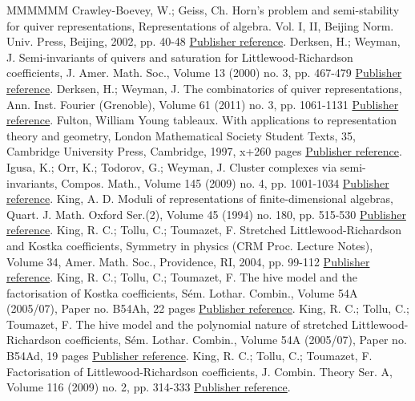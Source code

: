 \begin{thebibliography}{MMMMMM}
 Crawley-Boevey, W.; Geiss, Ch. Horn’s problem and semi-stability for quiver representations, Representations of algebra. Vol. I, II, Beijing Norm. Univ. Press, Beijing, 2002, pp. 40-48 \href{https://alco.centre-mersenne.org/articles/10.5802/alco.398/#CB}{Publisher reference}.
 Derksen, H.; Weyman, J. Semi-invariants of quivers and saturation for Littlewood-Richardson coefficients, J. Amer. Math. Soc., Volume 13 (2000) no. 3, pp. 467-479 \href{https://alco.centre-mersenne.org/articles/10.5802/alco.398/#DW1}{Publisher reference}.
 Derksen, H.; Weyman, J. The combinatorics of quiver representations, Ann. Inst. Fourier (Grenoble), Volume 61 (2011) no. 3, pp. 1061-1131 \href{https://alco.centre-mersenne.org/articles/10.5802/alco.398/#DW2}{Publisher reference}.
 Fulton, William Young tableaux. With applications to representation theory and geometry, London Mathematical Society Student Texts, 35, Cambridge University Press, Cambridge, 1997, x+260 pages \href{https://alco.centre-mersenne.org/articles/10.5802/alco.398/#F3}{Publisher reference}.
 Igusa, K.; Orr, K.; Todorov, G.; Weyman, J. Cluster complexes via semi-invariants, Compos. Math., Volume 145 (2009) no. 4, pp. 1001-1034 \href{https://alco.centre-mersenne.org/articles/10.5802/alco.398/#IOTW}{Publisher reference}.
 King, A. D. Moduli of representations of finite-dimensional algebras, Quart. J. Math. Oxford Ser.(2), Volume 45 (1994) no. 180, pp. 515-530 \href{https://alco.centre-mersenne.org/articles/10.5802/alco.398/#K}{Publisher reference}.
 King, R. C.; Tollu, C.; Toumazet, F. Stretched Littlewood-Richardson and Kostka coefficients, Symmetry in physics (CRM Proc. Lecture Notes), Volume 34, Amer. Math. Soc., Providence, RI, 2004, pp. 99-112 \href{https://alco.centre-mersenne.org/articles/10.5802/alco.398/#KTT}{Publisher reference}.
 King, R. C.; Tollu, C.; Toumazet, F. The hive model and the factorisation of Kostka coefficients, Sém. Lothar. Combin., Volume 54A (2005/07), Paper no. B54Ah, 22 pages \href{https://alco.centre-mersenne.org/articles/10.5802/alco.398/#KTT2}{Publisher reference}.
 King, R. C.; Tollu, C.; Toumazet, F. The hive model and the polynomial nature of stretched Littlewood-Richardson coefficients, Sém. Lothar. Combin., Volume 54A (2005/07), Paper no. B54Ad, 19 pages \href{https://alco.centre-mersenne.org/articles/10.5802/alco.398/#KTT3}{Publisher reference}.
 King, R. C.; Tollu, C.; Toumazet, F. Factorisation of Littlewood-Richardson coefficients, J. Combin. Theory Ser. A, Volume 116 (2009) no. 2, pp. 314-333 \href{https://alco.centre-mersenne.org/articles/10.5802/alco.398/#KTT4}{Publisher reference}.

\end{thebibliography}
